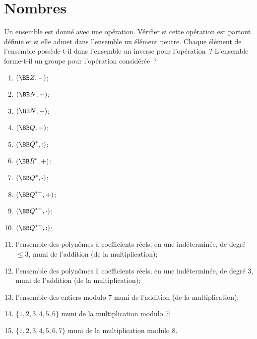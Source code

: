 \documentclass[12pt,french,oneside,a4paper]{memoir} %
\begin{document}
\chapter{Nombres}
\begin{exo}
Un ensemble est donné avec une opération. Vérifier si cette opération est partout définie et 
si elle admet dans l'ensemble un élément neutre. Chaque élément de l'ensemble possède-t-il dans l'ensemble
un inverse pour l'opération~? L'ensemble forme-t-il un groupe pour l'opération considérée~?
\begin{enumerate}
\item $({\BB Z},-)$;
\item $({\BB N},+)$;
\item $({\BB N},-)$;
\item $({\BB Q},-)$;
\item $({\BB Q}^*,:)$;
\item $({\BB R}^*,+)$;
\item $({\BB Q}^*,\cdot)$;
\item $({\BB Q}^{*+},+)$;
\item $({\BB Q}^{*+},\cdot)$;
\item $({\BB Q}^{*+},:)$;
\item l'ensemble des polynômes à coefficients réels, en une indéterminée, de degré $\leq 3$, muni de l'addition (de la multiplication);
\item l'ensemble des polynômes à coefficients réels, en une indéterminée, de degré 3, muni de l'addition (de la multiplication);
\item l'ensemble des entiers modulo 7 muni de l'addition (de la multiplication);
\item $\{1,2,3,4,5,6\}$  muni de la multiplication modulo 7;
\item $\{1,2,3,4,5,6,7\}$ muni de la multiplication modulo 8.
\end{enumerate}
\end{exo}
\end{document}
